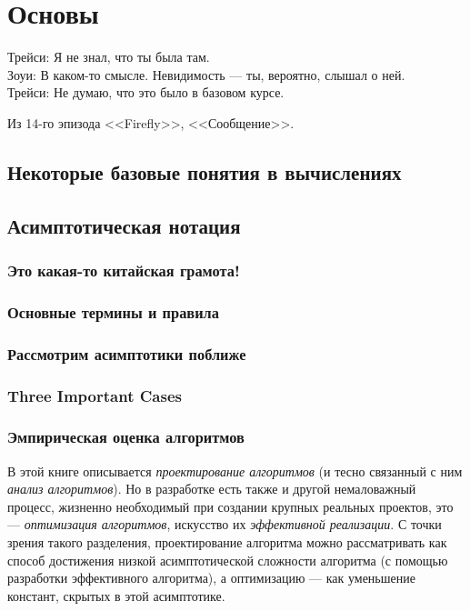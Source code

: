\chapter{Основы}
\label{chap:basics}

\epigraph{Трейси: Я не знал, что ты была там.\\
Зоуи: В каком-то смысле. Невидимость — ты, вероятно, слышал о ней.\\
Трейси: Не думаю, что это было в базовом курсе.
}{Из 14-го эпизода <<Firefly>>, <<Сообщение>>.}



\section{Некоторые базовые понятия в вычислениях}

\section{Асимптотическая нотация}
\subsection{Это какая-то китайская грамота!}
\subsection{Основные термины и правила}
\subsection{Рассмотрим асимптотики поближе}
\subsection{Three Important Cases}
\subsection{Эмпирическая оценка алгоритмов}
\label{sec:empirical-evaluation}

В этой книге описывается\textit{ проектирование алгоритмов} (и тесно связанный с ним\textit{ анализ алгоритмов}). Но в разработке есть также и другой немаловажный процесс, жизненно необходимый при создании крупных реальных проектов, это — \textit{оптимизация алгоритмов}, искусство их \textit{эффективной реализации}. С точки зрения такого разделения, проектирование алгоритма можно рассматривать как способ достижения низкой асимптотической сложности алгоритма (с помощью разработки эффективного алгоритма), а оптимизацию — как уменьшение констант, скрытых в этой асимптотике.

